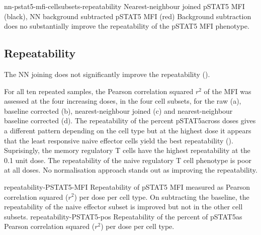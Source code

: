 {nn-pstat5-mfi-cellsubsets-repeatability}
{ Nearest-neighbour joined pSTAT5 MFI (black), NN background subtracted pSTAT5 MFI (red) }
{ 
  Background subtraction does no substantially improve the repeatability of the pSTAT5 MFI phenotype.
}




\subsection{Repeatability}


The NN joining does not significantly improve the repeatability ().

For all ten repeated samples, the Pearson correlation squared $r^2$ of the MFI was assessed at the four increasing doses, in the four cell subsets,
for the raw (a),
baseline corrected (b),
nearest-neighbour joined (c)
and nearest-neighbour baseline corrected (d).
The repeatability of the percent pSTAT5\positive across doses gives a different pattern depending on the cell type
but at the highest dose it appears that the least responsive naive effector cells yield the best
repeatability ().
Suprisingly, the memory regulatory T cells have the highest repeatability at the 0.1 unit dose.
The repeatability of the naive regulatory T cell phenotype is poor at all doses.
No normalisation approach stands out as improving the repeatability.

{repeatability-PSTAT5-MFI}
{
  Repeatability of pSTAT5 MFI measured as Pearson correlation squared ($r^2$) per dose per cell type.
}
{
  On subtracting the baseline, the repeatability of the naive effector subset is improved but not in the other cell subsets.
} 
{repeatability-PSTAT5-pos}
{
  Repeatability of the percent of pSTAT5\positive as Pearson correlation squared ($r^2$) per dose per cell type.
}
{
}

